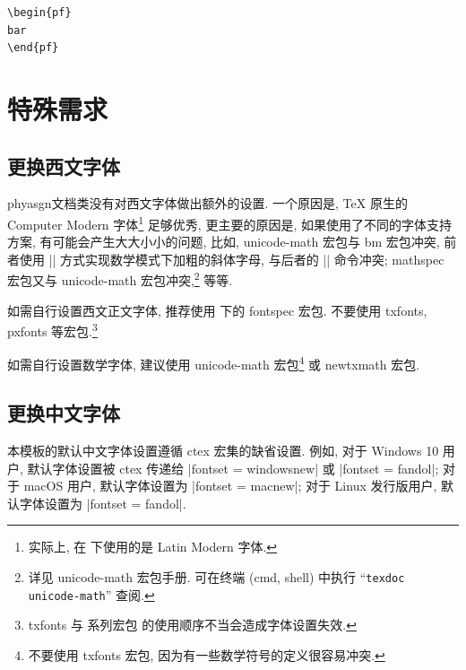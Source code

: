 \documentclass{phyasgn}\usepackage{nag}
\newcommand\pkg[1]{\textsf{#1}}
\def\phyasgn{\pkg{phyasgn}}
\begin{document}
\begin{flushleft}
\begin{minipage}{\textwidth}
\begin{minipage}{0.48\textwidth}
\begin{Verbatim}
\begin{pf}
bar
\end{pf}
\end{Verbatim}
\end{minipage}
\hfill
{}
\end{minipage}
\end{flushleft}



\section{特殊需求}
\subsection{更换西文字体}
\phyasgn 文档类没有对西文字体做出额外的设置. 一个原因是, \TeX{} 原生的 {\lm Computer Modern} 
字体\footnote{实际上, 在 \XeLaTeX{} 下使用的是 {\lm Latin Modern} 字体.}
足够优秀, 更主要的原因是, 如果使用了不同的字体支持方案, 有可能会产生大大小小的问题, 比如, 
\pkg{unicode-math} 宏包与 \pkg{bm} 宏包冲突, 
前者使用 |\symbfit| 方式实现数学模式下加粗的斜体字母, 与后者的 |\bm| 命令冲突; 
\pkg{mathspec} 宏包又与 \pkg{unicode-math} 宏包冲突,\footnote{详见 
\pkg{unicode-math} 宏包手册. 可在终端 (\textsf{cmd}, \textsf{shell}) 
中执行 ``\texttt{texdoc unicode-math}'' 查阅.} 等等. 

如需自行设置西文正文字体, 推荐使用 \XeLaTeX{} 下的 \pkg{fontspec} 宏包. 不要使用 
\pkg{txfonts}, \pkg{pxfonts} 等宏包.\footnote{\pkg{txfonts} 与 \AmS 系列宏包
的使用顺序不当会造成字体设置失效.}\label{不要使用txfonts}

如需自行设置数学字体, 建议使用 \pkg{unicode-math} 宏包\footnote{不要使用 \pkg{txfonts} 宏包, 
因为有一些数学符号的定义很容易冲突.} 
或 \pkg{newtxmath} 宏包.

\subsection{更换中文字体}
本模板的默认中文字体设置遵循 \pkg{ctex} 宏集的缺省设置. 例如, 对于 Windows 10 用户, 
默认字体设置被 \pkg{ctex} 传递给 |fontset = windowsnew| 或 |fontset = fandol|; 
对于 macOS 用户, 默认字体设置为 |fontset = macnew|; 
对于 Linux 发行版用户, 默认字体设置为 |fontset = fandol|.
\end{document}
